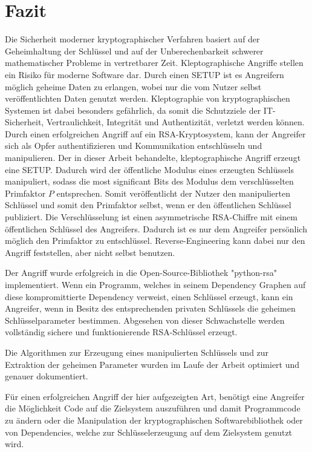 \chapter{Fazit}
    Die Sicherheit moderner kryptographischer Verfahren basiert auf der Geheimhaltung der Schlüssel und auf der Unberechenbarkeit schwerer mathematischer Probleme in vertretbarer Zeit.  
    Kleptographische Angriffe stellen ein Risiko für moderne Software dar. Durch einen \ac{SETUP} ist es Angreifern möglich geheime Daten zu erlangen, wobei nur die vom Nutzer selbst veröffentlichten Daten genutzt werden. 
    Kleptographie von kryptographischen Systemen ist dabei besonders gefährlich, da somit die Schutzziele der IT-Sicherheit, Vertraulichkeit, Integrität und Authentizität, verletzt werden können. Durch einen erfolgreichen Angriff auf ein RSA-Kryptosystem, kann der Angreifer sich als Opfer authentifizieren und Kommunikation entschlüsseln und manipulieren. 
    Der in dieser Arbeit behandelte, kleptographische Angriff erzeugt eine \ac{SETUP}. Dadurch wird der öffentliche Modulus eines erzeugten Schlüssels manipuliert, sodass die most significant Bits des Modulus dem verschlüsselten Primfaktor $P$ entsprechen. Somit veröffentlicht der Nutzer den manipulierten Schlüssel und somit den Primfaktor selbst, wenn er den öffentlichen Schlüssel publiziert. 
    Die Verschlüsselung ist einen asymmetrische RSA-Chiffre mit einem öffentlichen Schlüssel des Angreifers. Dadurch ist es nur dem Angreifer persönlich möglich den Primfaktor zu entschlüssel. Reverse-Engineering kann dabei nur den Angriff feststellen, aber nicht selbst benutzen.

    Der Angriff wurde erfolgreich in die Open-Source-Bibliothek "python-rsa" implementiert. Wenn ein Programm, welches in seinem Dependency Graphen auf diese kompromittierte Dependency verweist, einen Schlüssel erzeugt, kann ein Angreifer, wenn in Besitz des entsprechenden privaten Schlüssels die geheimen Schlüsselparameter bestimmen. Abgesehen von dieser Schwachstelle werden vollständig sichere und funktionierende \ac{RSA}-Schlüssel erzeugt.

    Die Algorithmen zur Erzeugung eines manipulierten Schlüssels und zur Extraktion der geheimen Parameter wurden im Laufe der Arbeit optimiert und genauer dokumentiert.

    Für einen erfolgreichen Angriff der hier aufgezeigten Art, benötigt eine Angreifer die Möglichkeit Code auf die Zielsystem auszuführen und damit Programmcode zu ändern oder die Manipulation der kryptographischen Softwarebibliothek oder von Dependencies, welche zur Schlüsselerzeugung auf dem Zielsystem genutzt wird.  